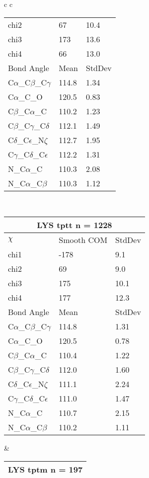 \begin{longtable}{ c c }
\begin{tabular}{ l l l }
  chi2 & 67 & 10.4 \\ 
  chi3 & 173 & 13.6 \\ 
  chi4 & 66 & 13.0 \\ \midrule
  Bond Angle   & Mean     & StdDev \\ \midrule
  C$\alpha$\_C$\beta$\_C$\gamma$ & 114.8 & 1.34\\
  C$\alpha$\_C\_O & 120.5 & 0.83\\
  C$\beta$\_C$\alpha$\_C & 110.2 & 1.23\\
  C$\beta$\_C$\gamma$\_C$\delta$ & 112.1 & 1.49\\
  C$\delta$\_C$\epsilon$\_N$\zeta$ & 112.7 & 1.95\\
  C$\gamma$\_C$\delta$\_C$\epsilon$ & 112.2 & 1.31\\
  N\_C$\alpha$\_C & 110.3 & 2.08\\
  N\_C$\alpha$\_C$\beta$ & 110.3 & 1.12\\
  \bottomrule
  \end{tabular}
  \\
  \begin{tabular}{ l l l }
  \toprule
  \multicolumn{3}{c}{LYS \textbf{tptt} n = 1228} \\ \toprule
  $\chi$       & Smooth COM & StdDev \\ \midrule
  chi1 & -178 & 9.1 \\ 
  chi2 & 69 & 9.0 \\ 
  chi3 & 175 & 10.1 \\ 
  chi4 & 177 & 12.3 \\ \midrule
  Bond Angle   & Mean     & StdDev \\ \midrule
  C$\alpha$\_C$\beta$\_C$\gamma$ & 114.8 & 1.31\\
  C$\alpha$\_C\_O & 120.5 & 0.78\\
  C$\beta$\_C$\alpha$\_C & 110.4 & 1.22\\
  C$\beta$\_C$\gamma$\_C$\delta$ & 112.0 & 1.60\\
  C$\delta$\_C$\epsilon$\_N$\zeta$ & 111.1 & 2.24\\
  C$\gamma$\_C$\delta$\_C$\epsilon$ & 111.0 & 1.47\\
  N\_C$\alpha$\_C & 110.7 & 2.15\\
  N\_C$\alpha$\_C$\beta$ & 110.2 & 1.11\\
  \bottomrule
  \end{tabular}
  &
  \begin{tabular}{ l l l }
  \toprule
  \multicolumn{3}{c}{LYS \textbf{tptm} n = 197} \\ \toprule

\end{tabular}
\end{longtable}
